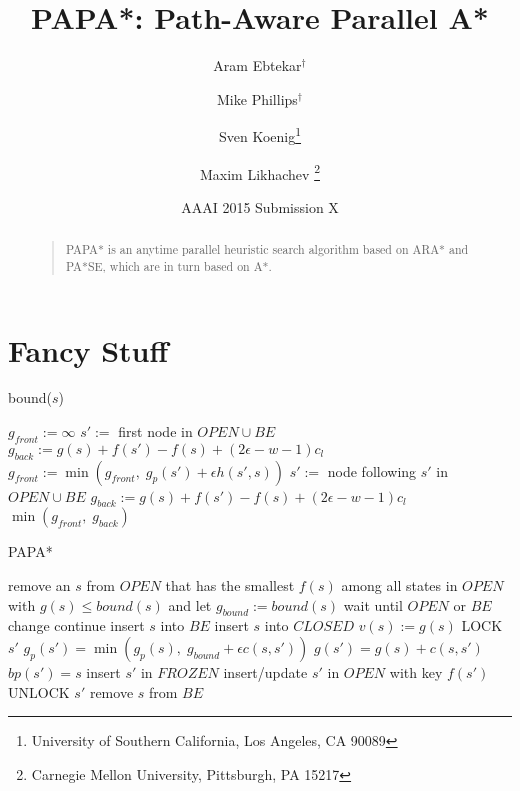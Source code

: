 \documentclass[letterpaper]{article}
\begin{document}
%
\title{PAPA*: Path-Aware Parallel A*}
\author{Aram Ebtekar$^\dagger$ \and Mike Phillips$^\dagger$ \and Sven Koenig\thanks{University of Southern California, Los Angeles, CA 90089} \and Maxim Likhachev%
\thanks{Carnegie Mellon University, Pittsburgh, PA 15217}%
%
}
\author{AAAI 2015 Submission X}%
\maketitle
\begin{abstract}
\begin{quote}
PAPA* is an anytime parallel heuristic search algorithm based on ARA* and PA*SE, which are in turn based on A*.
\end{quote}
\end{abstract}

\section{Fancy Stuff}

\begin{algorithm}
\caption{bound($s$)}
\label{alg:bound}
\begin{algorithmic}
\STATE $g_{front} := \infty$
\STATE $s' :=$ first node in $OPEN \cup BE$
\STATE $g_{back} := g(s) + f(s') - f(s) + (2\epsilon-w-1) c_l$
\STATE $g_{front} := \min(g_{front},\;g_p(s') + \epsilon h(s',s))$
\STATE $s' :=$ node following $s'$ in $OPEN \cup BE$
\STATE $g_{back} := g(s) + f(s') - f(s) + (2\epsilon-w-1) c_l$
\ENDWHILE
\RETURN $\min(g_{front},\;g_{back})$
\end{algorithmic}
\end{algorithm}

\begin{algorithm}
\caption{PAPA*}
\label{alg:PAPA*}
\begin{algorithmic}
\STATE remove an $s$ from $OPEN$ that has the smallest $f(s)$ among all states in $OPEN$ with $g(s) \le bound(s)$ and let $g_{bound} := bound(s)$
\STATE wait until $OPEN$ or $BE$ change
\STATE continue
\ENDIF
\STATE insert $s$ into $BE$
\STATE insert $s$ into $CLOSED$
\STATE $v(s) := g(s)$
\STATE LOCK $s'$
\STATE $g_p(s') = \min(g_p(s),\; g_{bound} + \epsilon c(s,s'))$
\STATE $g(s') = g(s) + c(s,s')$
\STATE $bp(s') = s$
\STATE insert $s'$ in $FROZEN$
\ELSE
\STATE insert/update $s'$ in $OPEN$ with key $f(s')$
\ENDIF
\ENDIF
\STATE UNLOCK $s'$
\ENDFOR
\STATE remove $s$ from $BE$
\ENDWHILE
\end{algorithmic}
\end{algorithm}
\end{document}
